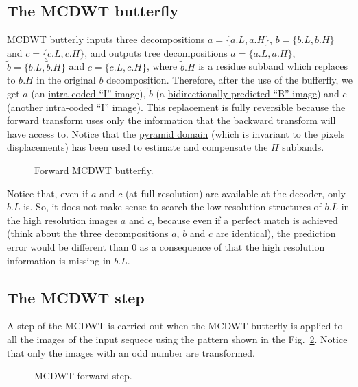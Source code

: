 \subsection{The MCDWT butterfly}
MCDWT butterly inputs three decompositions $a=\{a.L, a.H\}$, $b=\{b.L,
b.H\}$ and $c=\{c.L, c.H\}$, and outputs tree decompositions $a=\{a.L,
a.H\}$, $\tilde{b}=\{b.L, \tilde{b}.H\}$ and $c=\{c.L, c.H\}$, where
$\tilde{b}.H$ is a residue subband which replaces to $b.H$ in the
original $b$ decomposition. Therefore, after the use of the bufferfly,
we get $a$ (an
\href{https://en.wikipedia.org/wiki/Video_compression_picture_types}{intra-coded
  ``I'' image}), $\tilde{b}$ (a
\href{https://en.wikipedia.org/wiki/Video_compression_picture_types}{bidirectionally
  predicted ``B'' image}) and $c$ (another intra-coded ``I''
image). This replacement is fully reversible because the forward
transform uses only the information that the backward transform
will have access to. Notice that the
\href{http://www.vtvt.ece.vt.edu/research/references/video/DCT_Video_Compression/Zhang92a.pdf}{pyramid
  domain} (which is invariant to the pixels displacements) has been
used to estimate and compensate the $H$ subbands.

\begin{figure}
  \centering
  \caption{Forward MCDWT butterfly.}
  \label{fig:forward_butterfly}
\end{figure}



Notice that, even if $a$ and $c$ (at full resolution) are available at
the decoder, only $b.L$ is. So, it does not make sense to search the
low resolution structures of $b.L$ in the high resolution images $a$
and $c$, because even if a perfect match is achieved (think about the
three decompositions $a$, $b$ and $c$ are identical), the prediction error
would be different than $0$ as a consequence of that the high
resolution information is missing in $b.L$.

\subsection{The MCDWT step}
A step of the MCDWT is carried out when the MCDWT butterfly is applied
to all the images of the input sequece using the pattern shown in the
Fig.~\ref{fig:forward_MCDWT_step}. Notice that only the images with an
odd number are transformed.
\begin{figure}
  \centering
  \caption{MCDWT forward step.}
  \label{fig:forward_MCDWT_step}
\end{figure}

